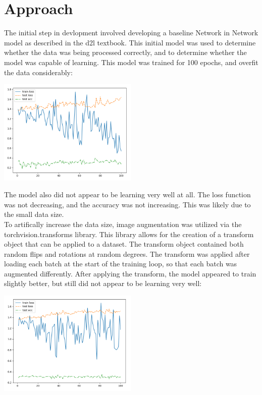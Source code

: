 \documentclass{article}[12pt]
\begin{document}
\section*{Approach}

The initial step in devlopment involved developing a baseline Network in Network model as described in the d2l textbook. This initial model was used to determine whether the data was being processed correctly, and to determine whether the model was capable of learning. This model was trained for 100 epochs, and overfit the data considerably: \\

\begin{center}
    \includegraphics[width=0.5\textwidth]{images/basic_model.png}
\end{center}

The model also did not appear to be learning very well at all. The loss function was not decreasing, and the accuracy was not increasing. This was likely due to the small data size.\\

To artifically increase the data size, image augmentation was utilized via the torchvision.transforms library. This library allows for the creation of a transform object that can be applied to a dataset. The transform object contained both random flips and rotations at random degrees. The transform was applied after loading each batch at the start of the training loop, so that each batch was augmented differently. After applying the transform, the model appeared to train slightly better, but still did not appear to be learning very well:\\

\begin{center}
    \includegraphics[width=0.5\textwidth]{images/basic_model_augmented.png}
\end{center}
\end{document}
